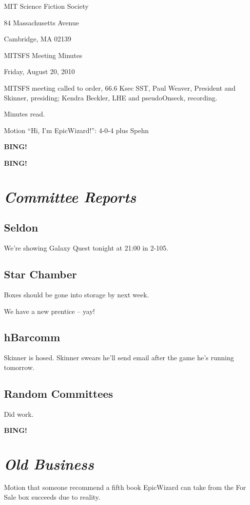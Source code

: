 \documentclass[10pt]{article}
\newcommand{\bing}{{\bf BING!} }
\newcommand{\goto}[1]{\bing \vskip 12pt \section*{{\em{#1}}}}
\newcommand{\ps}{ plus Spehn\xspace}
\newcommand{\skinner}{Paul Weaver, President and Skinner}
\newcommand{\onseck}{Kendra Beckler, LHE and pseudoOnseck}
\newcommand{\meetingdate}{Friday, August 20, 2010}
\begin{document}
\begin{center}

MIT Science Fiction Society

84 Massachusetts Avenue

Cambridge, MA 02139

\vspace{12pt}

MITSFS Meeting Minutes

\meetingdate

\end{center}

\vspace{18pt}

\setlength{\parskip}{6pt}

\noindent
MITSFS meeting called to order, 66.6 Ksec SST,
\skinner, presiding; \onseck, recording.

Minutes read.

Motion ``Hi, I'm EpicWizard!'': 4-0-4 \ps

\bing

\goto{Committee Reports}

\subsection*{Seldon}

We're showing Galaxy Quest tonight at 21:00 in 2-105.

\subsection*{Star Chamber}

Boxes should be gone into storage by next week.

We have a new prentice -- yay!

\subsection*{hBarcomm}

Skinner is hosed.  Skinner swears he'll send email after the game he's running tomorrow.

\subsection*{Random Committees}

Did work.

\goto{Old Business}

Motion that someone recommend a fifth book EpicWizard can take from the For Sale box succeeds due to reality.
\end{document}

